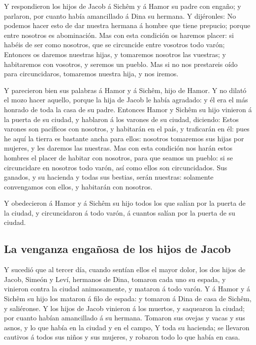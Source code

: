  Y respondieron los hijos de Jacob á Sichêm y á Hamor su
padre con engaño; y parlaron, por cuanto había amancillado á Dina su
hermana.  Y dijéronles: No podemos hacer esto de dar
nuestra hermana á hombre que tiene prepucio; porque entre nosotros es
abominación.  Mas con esta condición os haremos placer: si
habéis de ser como nosotros, que se circuncide entre vosotros todo
varón;  Entonces os daremos nuestras hijas, y tomaremos
nosotros las vuestras; y habitaremos con vosotros, y seremos un pueblo.
 Mas si no nos prestareis oído para circuncidaros,
tomaremos nuestra hija, y nos iremos.

 Y parecieron bien sus palabras á Hamor y á Sichêm, hijo de
Hamor.  Y no dilató el mozo hacer aquello, porque la hija
de Jacob le había agradado: y él era el más honrado de toda la casa de
su padre.  Entonces Hamor y Sichêm su hijo vinieron á la
puerta de su ciudad, y hablaron á los varones de su ciudad, diciendo:
 Estos varones son pacíficos con nosotros, y habitarán en
el país, y traficarán en él: pues he aquí la tierra es bastante ancha
para ellos: nosotros tomaremos sus hijas por mujeres, y les daremos las
nuestras.  Mas con esta condición nos harán estos hombres
el placer de habitar con nosotros, para que seamos un pueblo: si se
circuncidare en nosotros todo varón, así como ellos son circuncidados.
 Sus ganados, y su hacienda y todas sus bestias, serán
nuestras: solamente convengamos con ellos, y habitarán con nosotros.

 Y obedecieron á Hamor y á Sichêm su hijo todos los que
salían por la puerta de la ciudad, y circuncidaron á todo varón, á
cuantos salían por la puerta de su ciudad.

\hypertarget{la-venganza-engauxf1osa-de-los-hijos-de-jacob}{%
\subsection{La venganza engañosa de los hijos de
Jacob}\label{la-venganza-engauxf1osa-de-los-hijos-de-jacob}}

 Y sucedió que al tercer día, cuando sentían ellos el mayor
dolor, los dos hijos de Jacob, Simeón y Leví, hermanos de Dina, tomaron
cada uno su espada, y vinieron contra la ciudad animosamente, y mataron
á todo varón.  Y á Hamor y á Sichêm su hijo los mataron á
filo de espada: y tomaron á Dina de casa de Sichêm, y saliéronse.
 Y los hijos de Jacob vinieron á los muertos, y saquearon
la ciudad; por cuanto habían amancillado á su hermana. 
Tomaron sus ovejas y vacas y sus asnos, y lo que había en la ciudad y en
el campo,  Y toda su hacienda; se llevaron cautivos á todos
sus niños y sus mujeres, y robaron todo lo que había en casa.

